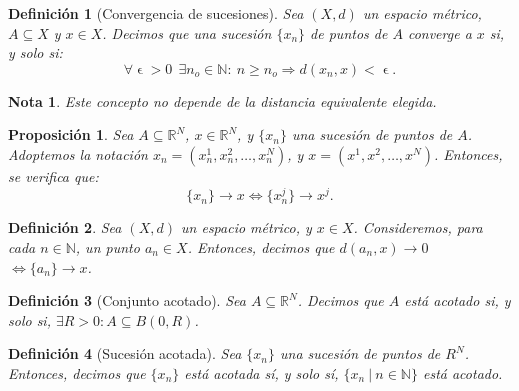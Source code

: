 \documentclass[11pt, a4paper, titlepage]{article}
\makeatletter
\let\epsilon\upvarepsilon
\renewenvironment{proof}[1][\proofname] {\vspace{-15pt}\par\pushQED{\qed}\normalfont\topsep6\p@\@plus6\p@\relax\trivlist\item[\hskip\labelsep\it#1\@addpunct{.}]\ignorespaces}{\popQED\endtrivlist\@endpefalse}
\theoremstyle{theorem-style}
\newtheorem*{nprop}{Proposición}
\theoremstyle{definition-style}
\newtheorem*{ndef}{Definición}
\theoremstyle{remark-style}
\newtheorem*{nota}{Nota}
\theoremstyle{example-style}
\makeatother
\begin{document}
\begin{ndef}[Convergencia de sucesiones]
Sea $(X,d)$ un espacio métrico, $A\subseteq X$ y $x\in X$. Decimos que una sucesión $\{x_n\}$ de puntos de $A$ converge a $x$ si, y solo si: $$ \forall \epsilon > 0\ \ \exists n_o \in \mathbb{N}: \ n\ge n_o \Rightarrow d(x_n,x) < \epsilon.$$
\end{ndef}



\begin{nota}
Este concepto no depende de la distancia equivalente elegida.
\end{nota}



\begin{nprop}
Sea $A\subseteq \mathbb{R}^N$, $x\in \mathbb{R}^N$, y $\{x_n\}$ una sucesión de puntos de $A$. Adoptemos la notación $x_n = (x_n^1, x_n^2,\dots,x_n^N)$, y $x=(x^1, x^2,\dots, x^N)$. Entonces, se verifica que:
$$\{x_n\} \rightarrow x \iff \{x_n^j\} \rightarrow x^j.$$
\end{nprop}








\begin{ndef}
Sea $(X,d)$ un espacio métrico, y $x\in X$. Consideremos, para cada $n\in \mathbb{N}$, un punto $a_n \in X$. Entonces, decimos que $d(a_n,x) \rightarrow 0$ $\iff \{a_n\} \rightarrow x$.
\end{ndef}



\begin{ndef}[Conjunto acotado]
Sea $A \subseteq \mathbb{R}^N$. Decimos que $A$ \textit{está acotado} si, y solo si, $\exists R>0: A\subseteq B(0,R)$.
\end{ndef}



\begin{ndef}[Sucesión acotada]
Sea $\{x_n\}$ una sucesión de puntos de $R^N$. Entonces, decimos que $\{x_n\}$ \textit{está acotada} sí, y solo sí, $\{x_n\ | \ n\in \mathbb{N}\}$ está acotado.
\end{ndef}
\end{document}
